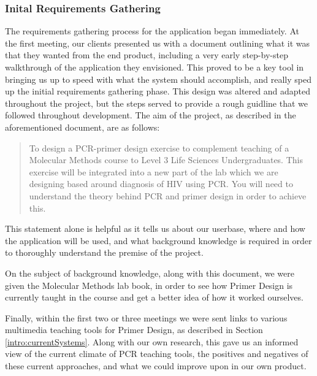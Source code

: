 
\subsubsection{Inital Requirements Gathering}
The requirements gathering process for the application began immediately.
At the first meeting, our clients presented us with a document outlining
what it was that they wanted from the end product, including a very
early step-by-step walkthrough of the application they envisioned. This
proved to be a key tool in bringing us up to speed with what the system
should accomplish, and really sped up the initial requirements gathering
phase. This design was altered and adapted throughout the
project, but the steps served to provide a rough guidline that we
followed throughout development. The aim of the project, as described in
the aforementioned document, are as follows:
\begin{quotation}
To design a PCR-primer design exercise to complement teaching of a
Molecular Methods course to Level 3 Life Sciences Undergraduates. This
exercise will be integrated into a new part of the lab which we are
designing based around diagnosis of HIV using PCR. You will need to
understand the theory behind PCR and primer design in order to achieve
this.
\end{quotation}
This statement alone is helpful as it tells us about our userbase, where
and how the application will be used, and what background knowledge is
required in order to thoroughly understand the premise of the project.

On the subject of background knowledge, along with this document, we 
were given the Molecular Methods lab book, in order to see how Primer 
Design is currently taught in the course and get a better idea of how
it worked ourselves.

Finally, within the first two or three meetings we were sent links to
various multimedia teaching tools for Primer Design, as described in
Section \ref{intro:currentSystems}. Along with our own research, this
gave us an informed view of the current climate of PCR teaching tools,
the positives and negatives of these current approaches, and what we
could improve upon in our own product.

